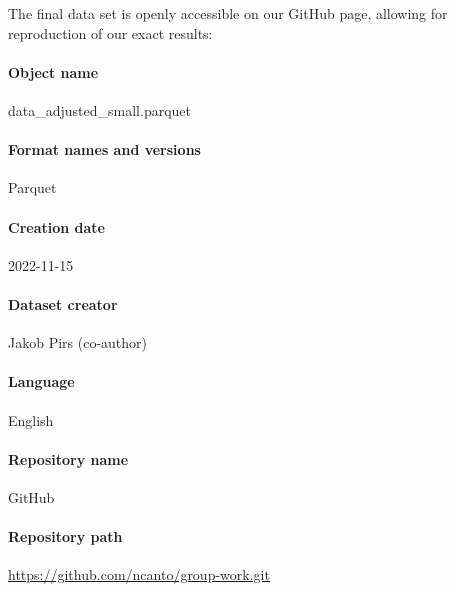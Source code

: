 The final data set is openly accessible on our GitHub page, allowing for reproduction of our exact results:
\paragraph{Object name} data\_adjusted\_small.parquet
\paragraph{Format names and versions} Parquet
\paragraph{Creation date} 2022-11-15
\paragraph{Dataset creator} Jakob Pirs (co-author)
\paragraph{Language} English
\paragraph{Repository name} GitHub 
\paragraph{Repository path} \url{https://github.com/ncanto/group-work.git}


